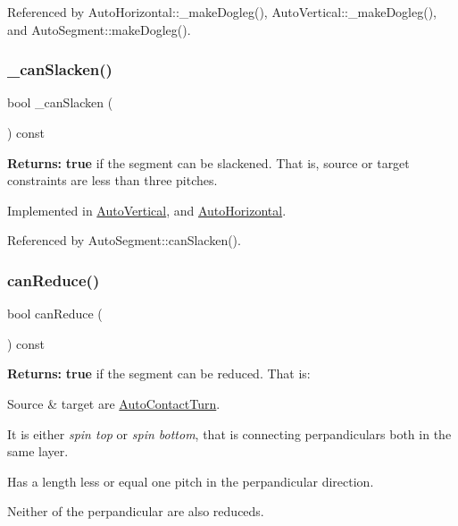 Referenced by Auto\+Horizontal\+::\+\_\+make\+Dogleg(), Auto\+Vertical\+::\+\_\+make\+Dogleg(), and Auto\+Segment\+::make\+Dogleg().

\mbox{\label{classKatabatic_1_1AutoSegment_a676fcb7ece71d129b7a4d87a3f2e07aa}} 
\subsubsection{\texorpdfstring{\+\_\+can\+Slacken()}{\_canSlacken()}}
{\footnotesize\ttfamily bool \+\_\+can\+Slacken (\begin{DoxyParamCaption}{ }\end{DoxyParamCaption}) const\hspace{0.3cm}{\ttfamily [pure virtual]}}

{\bfseries Returns\+:} {\bfseries true} if the segment can be slackened. That is, source or target constraints are less than three pitches. 

Implemented in \hyperlink{classKatabatic_1_1AutoVertical_a2ced98fb06f208aa88c0962a706e64db}{Auto\+Vertical}, and \hyperlink{classKatabatic_1_1AutoHorizontal_a2ced98fb06f208aa88c0962a706e64db}{Auto\+Horizontal}.



Referenced by Auto\+Segment\+::can\+Slacken().

\mbox{\label{classKatabatic_1_1AutoSegment_af1a231b2324a486d4ef61b247886cdeb}} 
\subsubsection{\texorpdfstring{can\+Reduce()}{canReduce()}}
{\footnotesize\ttfamily bool can\+Reduce (\begin{DoxyParamCaption}{ }\end{DoxyParamCaption}) const}

{\bfseries Returns\+:} {\bfseries true} if the segment can be reduced. That is\+:
\begin{DoxyItemize}
\item Source \& target are \hyperlink{classKatabatic_1_1AutoContactTurn}{Auto\+Contact\+Turn}.
\item It is either {\itshape spin top} or {\itshape spin bottom}, that is connecting perpandiculars both in the same layer.
\item Has a length less or equal one pitch in the perpandicular direction.
\item Neither of the perpandicular are also reduceds. 
\end{DoxyItemize}

